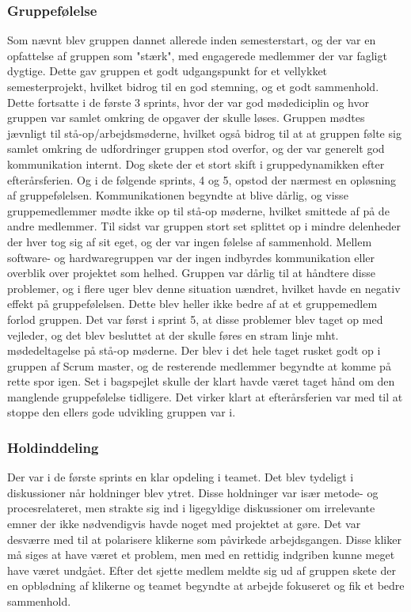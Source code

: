 \subsubsection{Gruppefølelse}
Som nævnt blev gruppen dannet allerede inden semesterstart, og der var en opfattelse af gruppen som "stærk", med engagerede medlemmer der var fagligt dygtige. Dette gav gruppen et godt udgangspunkt for et vellykket semesterprojekt, hvilket bidrog til en god stemning, og et godt sammenhold. Dette fortsatte i de første 3 sprints, hvor der var god mødediciplin og hvor gruppen var samlet omkring de opgaver der skulle løses. Gruppen mødtes jævnligt til stå-op/arbejdsmøderne, hvilket også bidrog til at at gruppen følte sig samlet omkring de udfordringer gruppen stod overfor, og der var generelt god kommunikation internt. Dog skete der et 
stort skift i gruppedynamikken efter efterårsferien. Og i de følgende sprints, 4 og 5, opstod der nærmest en opløsning af gruppefølelsen. Kommunikationen begyndte at blive dårlig, og visse gruppemedlemmer mødte ikke op til stå-op møderne, hvilket smittede af på de andre medlemmer. Til sidst var gruppen stort set splittet op i mindre delenheder der hver tog sig af sit eget, og der var ingen følelse af sammenhold. Mellem software- og hardwaregruppen var der ingen indbyrdes kommunikation eller overblik over projektet som helhed. Gruppen var dårlig til at håndtere disse problemer, og i flere uger blev denne situation uændret, hvilket havde en negativ effekt på gruppefølelsen. Dette blev heller ikke bedre af at et gruppemedlem forlod gruppen. Det var først i sprint 5, at disse problemer blev taget op med vejleder, og det blev besluttet at der skulle føres en stram linje mht. mødedeltagelse på stå-op møderne. Der blev i det hele taget rusket godt op i gruppen af Scrum master, og de resterende medlemmer begyndte at komme på rette spor igen. Set i bagspejlet skulle der klart havde været taget hånd om den manglende gruppefølelse tidligere. Det virker klart at efterårsferien var med til at stoppe den ellers gode udvikling gruppen var i.

\subsubsection{Holdinddeling}
Der var i de første sprints en klar opdeling i teamet. Det blev tydeligt i diskussioner når holdninger blev ytret. Disse holdninger var især metode- og procesrelateret, men strakte sig ind i ligegyldige diskussioner om irrelevante emner der ikke nødvendigvis havde noget med projektet at gøre. Det var desværre med til at polarisere klikerne som påvirkede arbejdsgangen. Disse kliker må siges at have været et problem, men med en rettidig indgriben kunne meget have været undgået. Efter det sjette medlem meldte sig ud af gruppen skete der en opblødning af klikerne og teamet begyndte at arbejde fokuseret og fik et bedre sammenhold.

